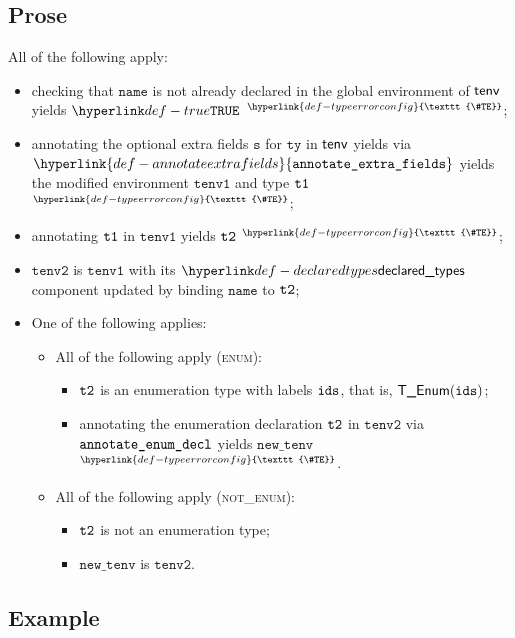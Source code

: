 \documentclass{book}
\newcommand\TypeErrorConfig[0]{\hyperlink{def-typeerrorconfig}{\texttt{\#TE}}}
\newcommand\ProseOrTypeError[0]{\hyperlink{def-proseortypeerror}{$^{\TypeErrorConfig}$}}
\newcommand\annotateextrafields[0]{\hyperlink{def-annotateextrafields}{\texttt{annotate\_extra\_fields}}}
\newcommand\newtenv[0]{\texttt{new\_tenv}}
\newcommand\tenvone[0]{\texttt{tenv1}}
\newcommand\tenvtwo[0]{\texttt{tenv2}}
\newcommand\vs[0]{\texttt{s}}
\newcommand\tty[0]{\texttt{ty}}
\newcommand\name[0]{\texttt{name}}
\begin{document}
\subsection{Prose}
All of the following apply:
\begin{itemize}
  \item checking that $\name$ is not already declared in the global environment of $\textsf{tenv}$ yields $\True$ \ProseOrTypeError;
  \item annotating the optional extra fields $\vs$ for $\tty$ in $\textsf{tenv}$ yields via \\ $\annotateextrafields$
        yields the modified environment $\tenvone$ and type $\texttt{t1}$ \ProseOrTypeError;
  \item annotating $\texttt{t1}$ in $\tenvone$ yields $\texttt{t2}$ \ProseOrTypeError;
  \item $\tenvtwo$ is $\tenvone$ with its $\declaredtypes$ component updated by binding $\name$ to $\texttt{t2}$;
  \item One of the following applies:
  \begin{itemize}
    \item All of the following apply (\textsc{enum}):
    \begin{itemize}
      \item $\texttt{t2}$ is an enumeration type with labels $\texttt{ids}$, that is, $\textsf{T\_Enum}(\texttt{ids})$;
      \item annotating the enumeration declaration $\texttt{t2}$ in $\tenvtwo$ via \\
            $\texttt{annotate\_enum\_decl}$ yields $\newtenv$ \ProseOrTypeError.
    \end{itemize}

    \item All of the following apply (\textsc{not\_enum}):
    \begin{itemize}
      \item $\texttt{t2}$ is not an enumeration type;
      \item $\newtenv$ is $\tenvtwo$.
    \end{itemize}
  \end{itemize}
\end{itemize}

\subsection{Example}
\end{document}
